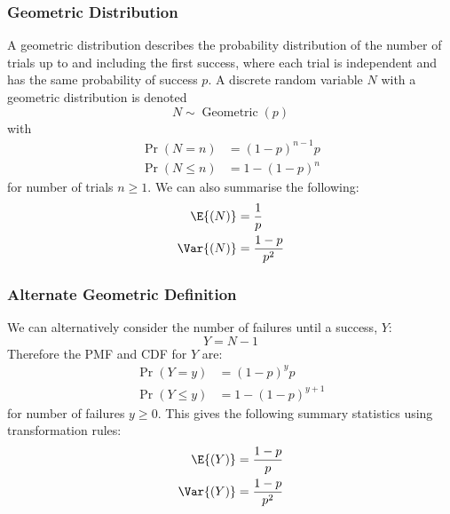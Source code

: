 \documentclass{article}
\begin{document}
\subsubsection{Geometric Distribution}
A geometric distribution describes the probability distribution of the
number of trials up to and including the first success, where each
trial is independent and has the same probability of success \(p\). A
discrete random variable \(N\) with a geometric distribution is denoted
\begin{equation*}
    N \sim \operatorname{Geometric}{\left( p \right)}
\end{equation*}
with
\begin{align*}
    \Pr{\left( N = n \right)}    & = \left( 1 - p \right)^{n - 1} p \\
    \Pr{\left( N \leq n \right)} & = 1 - \left( 1 - p \right)^n
\end{align*}
for number of trials \(n \geq 1\).
We can also summarise the following:
\begin{align*}
    \E{\left( N \right)}   & = \frac{1}{p}       \\
    \Var{\left( N \right)} & = \frac{1 - p}{p^2}
\end{align*}
\subsubsection{Alternate Geometric Definition}
We can alternatively consider the number of failures until a success,
\(Y\):
\begin{equation*}
    Y = N - 1
\end{equation*}
Therefore the PMF and CDF for \(Y\) are:
\begin{align*}
    \Pr{\left( Y = y \right)}    & = \left( 1 - p \right)^y p         \\
    \Pr{\left( Y \leq y \right)} & = 1 - \left( 1 - p \right)^{y + 1}
\end{align*}
for number of failures \(y \geq 0\). This gives the following summary
statistics using transformation rules:
\begin{align*}
    \E{\left( Y \right)}   & = \frac{1 - p}{p}   \\
    \Var{\left( Y \right)} & = \frac{1 - p}{p^2}
\end{align*}
\end{document}
